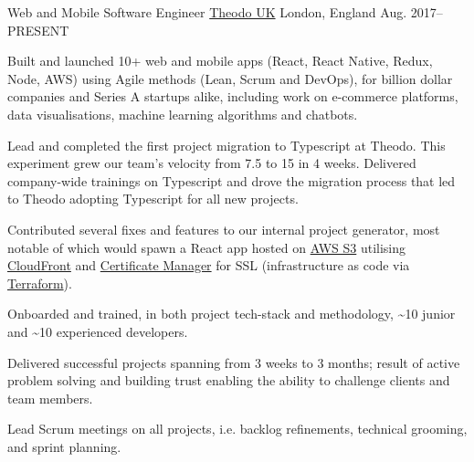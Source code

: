 \vspace{-3mm}

\begin{cventries}

  \cventry
    {Web and Mobile Software Engineer}
    {\href{https://www.theodo.co.uk/}{Theodo UK}}
    {London, England}
    {Aug. 2017--\textsc{PRESENT}}
    {
      \begin{cvitems}
        \item Built and launched 10+ web and mobile apps (React, React Native, Redux, Node, AWS) using Agile methods (Lean, Scrum and DevOps), for billion dollar companies and Series A startups alike, including work on e-commerce platforms, data visualisations, machine learning algorithms and chatbots.
        \item Lead and completed the first project migration to Typescript at Theodo. This experiment grew our team's velocity from 7.5 to 15 in 4 weeks. Delivered company-wide trainings on Typescript and drove the migration process that led to Theodo adopting Typescript for all new projects.
        \item Contributed several fixes and features to our internal project generator, most notable of which would spawn a React app hosted on \href{https://aws.amazon.com/s3/}{AWS S3} utilising \href{https://aws.amazon.com/cloudfront/}{CloudFront} and \href{https://aws.amazon.com/certificate-manager/}{Certificate Manager} for SSL (infrastructure as code via \href{https://www.terraform.io/}{Terraform}).
        \item Onboarded and trained, in both project tech-stack and methodology, \textasciitilde{}10 junior and \textasciitilde{}10 experienced developers.
        \item Delivered successful projects spanning from 3 weeks to 3 months; result of active problem solving and building trust enabling the ability to challenge clients and team members.
        \item Lead Scrum meetings on all projects, i.e. backlog refinements, technical grooming, and sprint planning. 
      \end{cvitems}
    }

\end{cventries}
